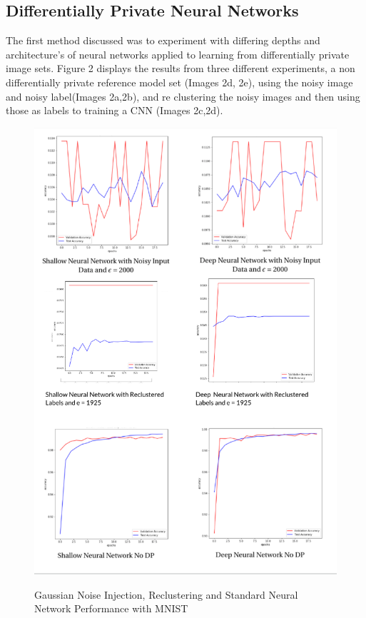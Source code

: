 \documentclass[12pt]{report}
\begin{document}
\subsection{Differentially Private Neural Networks}
The first method discussed was to experiment with differing depths and architecture's of neural networks applied to learning from differentially private image sets. Figure 2 displays the results from three different experiments, a non differentially private reference model set (Images 2d, 2e), using the noisy image and noisy label(Images 2a,2b), and re clustering the noisy images and then using those as labels to training a CNN (Images 2c,2d).  
\newpage
\begin{figure}
    \centering
    \includegraphics[scale = 0.6]{new_fig.png}
    \label{fig:my_label}
    \caption{Gaussian Noise Injection, Reclustering and Standard Neural Network Performance with MNIST}
\end{figure}
\end{document}
